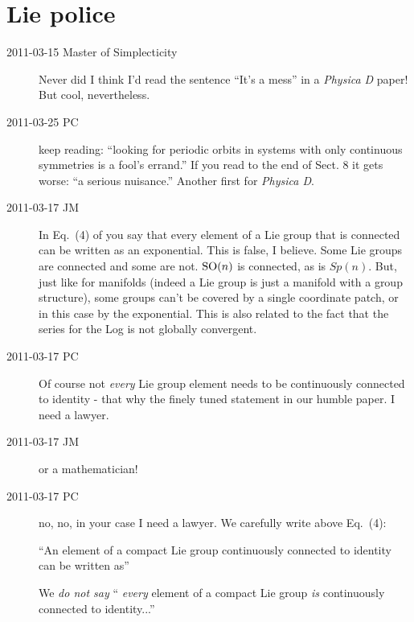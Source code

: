 
\chapter{Lie police}
\label{sect:LiePolice}

\renewcommand{\LieEl}{\ensuremath{g}}  %

\begin{description}
\item[2011-03-15
{Master of Simplecticity}]
Never did I think I'd read the sentence ``It's a mess'' in a
\emph{Physica D} paper! But cool, nevertheless.

\item[2011-03-25 PC] keep reading:
``looking for periodic orbits in systems with only continuous symmetries
is a fool's errand.'' If you read to the end of Sect. 8 it gets worse:
``a serious nuisance.'' Another first for \emph{Physica D}.

\item[2011-03-17 JM]
In Eq.~(4) of  you say that every element of a Lie group
that is connected can be written as an exponential. This is false, I
believe. Some Lie groups are connected and some are not. $\textrm{SO}(n)$ is
connected, as is $Sp(n)$. But, just like for manifolds (indeed a Lie
group is just a manifold with a group structure), some groups can't be
covered by a single coordinate patch, or in this case by the exponential.
This is also related to the fact that the series for the  Log is not
globally convergent.

\item[2011-03-17 PC]
Of course not {\em every} Lie group element needs to be continuously
connected to identity - that why the finely tuned statement in our humble
paper.
I need a lawyer.

\item[2011-03-17 JM] or a mathematician!

\item[2011-03-17 PC]
no, no, in your case I need a lawyer. We carefully
write above Eq.~(4):

``An element of a compact Lie group
continuously connected to identity can be written as''

We \emph{do not say}
``\emph{\color{red} every} element of a compact Lie group
\emph{\color{red} is} continuously connected to identity...''


\end{description}
